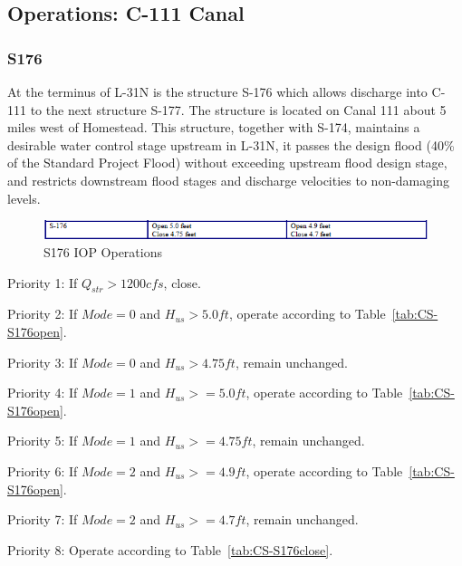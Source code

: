 \subsection{Operations: C-111 Canal}

\subsubsection{S176}
At the terminus of L-31N is the structure S-176 which allows discharge into C-111 to the next structure S-177.
The structure is located on Canal 111 about 5 miles west of Homestead. This structure, together with S-174, maintains a desirable water control stage upstream in L-31N, it passes the design flood (40\% of the Standard Project Flood) without exceeding upstream flood design stage, and restricts downstream flood stages and discharge velocities to non-damaging levels.


\begin{figure}[!h]
  \begin{center}
  \includegraphics[width=6.5in]{../figs/S176_IOPops.png}
  \caption{S176 IOP Operations}
  \label{fig:S176iop}
  \end{center}
\end{figure}

\begin{packed_items}
\item Priority 1: If $Q_{str}>1200 cfs$, close.
\item[]
\item Priority 2: If $Mode=0$ and $H_{us}>5.0 ft$, operate according to Table~\ref{tab:CS-S176open}.
\item Priority 3: If $Mode=0$ and $H_{us}>4.75 ft$, remain unchanged.
\item[]
\item Priority 4: If $Mode=1$ and $H_{us}>=5.0 ft$, operate according to Table~\ref{tab:CS-S176open}.
\item Priority 5: If $Mode=1$ and $H_{us}>=4.75 ft$, remain unchanged.
\item[]
\item Priority 6: If $Mode=2$ and $H_{us}>=4.9 ft$, operate according to Table~\ref{tab:CS-S176open}.
\item Priority 7: If $Mode=2$ and $H_{us}>=4.7 ft$, remain unchanged.
\item[]
\item Priority 8: Operate according to Table~\ref{tab:CS-S176close}.
\end{packed_items}

